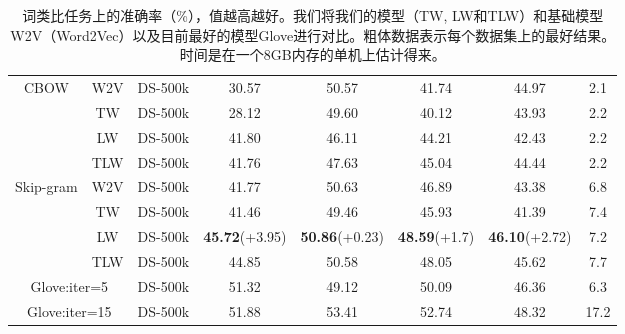 \documentclass[master]{njuthesis}
\begin{document}
\begin{itemize}
\begin{table}[htbp]
\begin{center}
\begin{tabular}{|c|c|c|c|c|c|c|c|}
\hline
\multirow{4}{*}{CBOW}                   & W2V          & DS-500k             & 30.57           & 50.57            & 41.74          & 44.97            & 2.1            \\ \cline{2-8} 
                                        & TW           & DS-500k             & 28.12           & 49.60            & 40.12          & 43.93            & 2.2             \\ \cline{2-8} 
                                        & LW           & DS-500k             & 41.80           & 46.11            & 44.21          & 42.43            & 2.2             \\ \cline{2-8} 
                                        & TLW          & DS-500k             & 41.76           & 47.63            & 45.04          & 44.44            & 2.2             \\ \hline
\multirow{4}{*}{Skip-gram}              & W2V          & DS-500k             & 41.77           & 50.63            & 46.89          & 43.38            & 6.8            \\ \cline{2-8} 
                                        & TW           & DS-500k             & 41.46           & 49.46            & 45.93          & 41.39            & 7.4            \\ \cline{2-8} 
                                        & LW           & DS-500k             & \textbf{45.72}(+3.95)              & \textbf{50.86}(+0.23)  & \textbf{48.59}(+1.7)  & \textbf{46.10}(+2.72)    & 7.2            \\ \cline{2-8} 
                                        & TLW          & DS-500k             & 44.85  		    & 50.58             & 48.05 		    & 45.62            & 7.7            \\ \hline
\multicolumn{2}{|c|}{Glove:iter=5} 							 & DS-500k             & 51.32           & 49.12             & 50.09          & 46.36             & 6.3            \\ \hline
\multicolumn{2}{|c|}{Glove:iter=15} 						 & DS-500k             & 51.88           & 53.41             & 52.74          & 48.32             & 17.2            \\ \hline
\end{tabular}
\end{center}
\caption{\label{tab:wordanalogies_chap4} 词类比任务上的准确率（\%），值越高越好。我们将我们的模型（TW, LW和TLW）和基础模型W2V（Word2Vec）以及目前最好的模型Glove进行对比。粗体数据表示每个数据集上的最好结果。时间是在一个8GB内存的单机上估计得来。}
\end{table}
	

\end{itemize}
\end{document}

